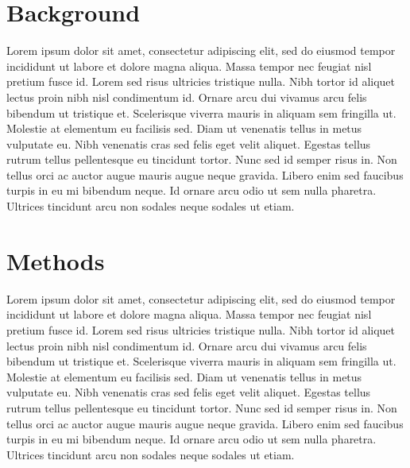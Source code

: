 \documentclass[twocolumn]{bmcart}%
\begin{document}

\section*{Background}

Lorem ipsum dolor sit amet, consectetur adipiscing elit, sed do eiusmod tempor incididunt ut labore et dolore magna aliqua. Massa tempor nec feugiat nisl pretium fusce id. Lorem sed risus ultricies tristique nulla. Nibh tortor id aliquet lectus proin nibh nisl condimentum id. Ornare arcu dui vivamus arcu felis bibendum ut tristique et. Scelerisque viverra mauris in aliquam sem fringilla ut. Molestie at elementum eu facilisis sed. Diam ut venenatis tellus in metus vulputate eu. Nibh venenatis cras sed felis eget velit aliquet. Egestas tellus rutrum tellus pellentesque eu tincidunt tortor. Nunc sed id semper risus in. Non tellus orci ac auctor augue mauris augue neque gravida. Libero enim sed faucibus turpis in eu mi bibendum neque. Id ornare arcu odio ut sem nulla pharetra. Ultrices tincidunt arcu non sodales neque sodales ut etiam.

\section*{Methods}
Lorem ipsum dolor sit amet, consectetur adipiscing elit, sed do eiusmod tempor incididunt ut labore et dolore magna aliqua. Massa tempor nec feugiat nisl pretium fusce id. Lorem sed risus ultricies tristique nulla. Nibh tortor id aliquet lectus proin nibh nisl condimentum id. Ornare arcu dui vivamus arcu felis bibendum ut tristique et. Scelerisque viverra mauris in aliquam sem fringilla ut. Molestie at elementum eu facilisis sed. Diam ut venenatis tellus in metus vulputate eu. Nibh venenatis cras sed felis eget velit aliquet. Egestas tellus rutrum tellus pellentesque eu tincidunt tortor. Nunc sed id semper risus in. Non tellus orci ac auctor augue mauris augue neque gravida. Libero enim sed faucibus turpis in eu mi bibendum neque. Id ornare arcu odio ut sem nulla pharetra. Ultrices tincidunt arcu non sodales neque sodales ut etiam.
\end{document}
